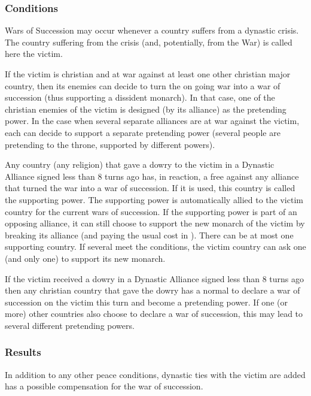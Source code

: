 \label{chSpecific:War of Succession}


\subsubsection{Conditions}
\aparag Wars of Succession may occur whenever a country suffers from a
dynastic crisis. The country suffering from the crisis (and, potentially, from
the War) is called here the victim.

\aparag If the victim is christian and at war against at least one other
christian major country, then its enemies can decide to turn the on going war
into a war of succession (thus supporting a dissident monarch).
\bparag In that case, one of the christian enemies of the victim is designed
(by its alliance) as the pretending power.
\bparag In the case when several separate alliances are at war against the
victim, each can decide to support a separate pretending power (several people
are pretending to the throne, supported by different powers).

\aparag Any country (any religion) that gave a dowry to the victim in a
Dynastic Alliance signed less than 8 turns ago has, in reaction, a free \CB
against any alliance that turned the war into a war of succession. If it is
used, this country is called the supporting power.
\bparag The supporting power is automatically allied to the victim country for
the current wars of succession.
\bparag If the supporting power is part of an opposing alliance, it can still
choose to support the new monarch of the victim by breaking its alliance (and
paying the usual cost in \STAB).
\bparag There can be at most one supporting country. If several meet the
conditions, the victim country can ask one (and only one) to support its new
monarch.

\aparag If the victim received a dowry in a Dynastic Alliance signed less than
8 turns ago then any christian country that gave the dowry has a normal \CB to
declare a war of succession on the victim this turn and become a pretending
power.
\bparag If one (or more) other countries also choose to declare a war of
succession, this may lead to several different pretending powers.


\subsubsection{Results}
\aparag In addition to any other peace conditions, dynastic ties with the
victim are added has a possible compensation for the war of succession.

